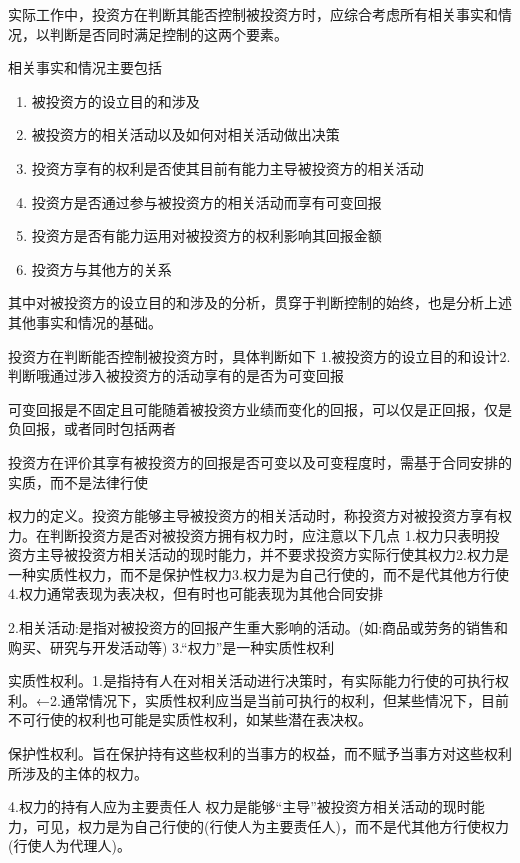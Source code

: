 \documentclass[UTF8,12pt]{ctexart}
\numberwithin{equation}{section} %
\numberwithin{figure}{section}
\numberwithin{table}{section}
\begin{document}
	实际工作中，投资方在判断其能否控制被投资方时，应综合考虑所有相关事实和情况，以判断是否同时满足控制的这两个要素。
	
	相关事实和情况主要包括
	\begin{enumerate}
		\item 被投资方的设立目的和涉及
		
		\item 被投资方的相关活动以及如何对相关活动做出决策
		
		\item 投资方享有的权利是否使其目前有能力主导被投资方的相关活动
		
		\item 投资方是否通过参与被投资方的相关活动而享有可变回报
		
		\item 投资方是否有能力运用对被投资方的权利影响其回报金额
		
		\item 投资方与其他方的关系
	\end{enumerate}
	其中对被投资方的设立目的和涉及的分析，贯穿于判断控制的始终，也是分析上述其他事实和情况的基础。
	
	投资方在判断能否控制被投资方时，具体判断如下
	1.被投资方的设立目的和设计2.判断哦通过涉入被投资方的活动享有的是否为可变回报
	
	可变回报是不固定且可能随着被投资方业绩而变化的回报，可以仅是正回报，仅是负回报，或者同时包括两者
	
	投资方在评价其享有被投资方的回报是否可变以及可变程度时，需基于合同安排的实质，而不是法律行使
	
	权力的定义。投资方能够主导被投资方的相关活动时，称投资方对被投资方享有权力。在判断投资方是否对被投资方拥有权力时，应注意以下几点
	1.权力只表明投资方主导被投资方相关活动的现时能力，并不要求投资方实际行使其权力2.权力是一种实质性权力，而不是保护性权力3.权力是为自己行使的，而不是代其他方行使4.权力通常表现为表决权，但有时也可能表现为其他合同安排
	
	2.相关活动:是指对被投资方的回报产生重大影响的活动。(如:商品或劳务的销售和购买、研究与开发活动等)
	3.“权力”是一种实质性权利
	
	实质性权利。1.是指持有人在对相关活动进行决策时，有实际能力行使的可执行权利。←2.通常情况下，实质性权利应当是当前可执行的权利，但某些情况下，目前不可行使的权利也可能是实质性权利，如某些潜在表决权。
	
	保护性权利。旨在保护持有这些权利的当事方的权益，而不赋予当事方对这些权利所涉及的主体的权力。
	
	4.权力的持有人应为主要责任人
	权力是能够“主导”被投资方相关活动的现时能力，可见，权力是为自己行使的(行使人为主要责任人)，而不是代其他方行使权力(行使人为代理人)。
	
\end{document}
